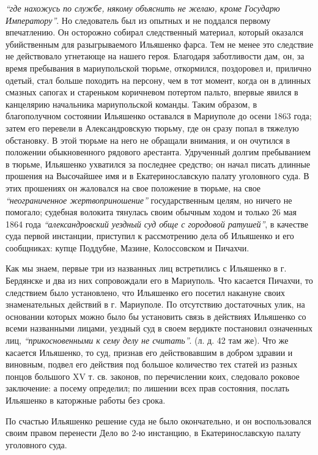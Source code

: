 \documentclass[a4paper,20pt]{report}
\begin{document}
\emph{``где нахожусь по службе, някому объяснить не желаю, кроме Государю Императору''}. 
Но следователь был из опытных и не поддался первому впечатлению. Он осторожно собирал следственный материал, который оказался
убийственным для разыгрываемого Ильяшенко фарса.
Тем не менее это следствие не действовало угнетающе на нашего героя. 
Благодаря заботливости дам, он, за время пребывания в мариупольской тюрьме, откормился, 
поздоровел и, прилично одетый, стал больше походить на персону, чем в тот
момент, когда он в длинных смазных сапогах и стареньком коричневом потертом пальто, 
впервые явился в
канцелярию начальника мариупольской команды. Таким образом, в благополучном состоянии Ильяшенко оставался в Мариуполе до осени
1863 года; затем его перевели в
Александровскую тюрьму, где он сразу попал в тяжелую
обстановку. В этой тюрьме на него не обращали внимания,
и он очутился в положении обыкновенного рядового арестанта.
Удрученный долгим пребыванием в тюрьме, Ильяшенко ухватился за последнее средство; он начал писать длинные прошения на Высочайшее имя и в Екатеринославскую палату уголовного суда. В этих прошениях он жаловался на свое положение в тюрьме, 
на свое \emph{``неограниченное жертвоприношение''} государственным целям, но ничего не помогало; судебная волокита тянулась
своим обычным ходом и только 26 мая 1864 года
\emph{``александровский уездный суд обще с городовой ратушей''},
в качестве суда первой инстанции, приступил к рассмотрению дела об Ильяшенко и его сообщниках:
купце Поддубне, Мазине, Колоссовском и Пичахчи.

Как мы знаем, первые три из названных лиц
встретились с Ильяшенко в г. Бердянске и два из них
сопровождали его в Мариуполь. Что касается Пичахчи, то
следствием было установлено, что Ильяшенко его посетил накануне своих знаменательных действий в г. Мариуполе.
По отсутствию достаточных улик, на основании которых
можно было бы установить связь в действиях Ильяшенко
со всеми названными лицами, уездный суд в своем вердикте постановил
означенных лиц, \emph{``прикосновенными к сему делу не считать''}. (л. д. 42 там же). 
Что же касается Ильяшенко, то суд, признав его действовавшим в добром здравии и
виновным, подвел его действия под большое количество тех статей из разных
понцов большого XV т. св. законов, по перечислении коих, следовало роковое
заключение: а посему определил; по лишении всех прав состояния, послать
Ильяшенко в каторжные работы без срока.

По счастью Ильяшенко решение суда не было окончательно, и он воспользовался 
своим правом перенести Дело во 2-ю инстанцию, в Екатеринославскую палату уголовного суда. 
\end{document}

